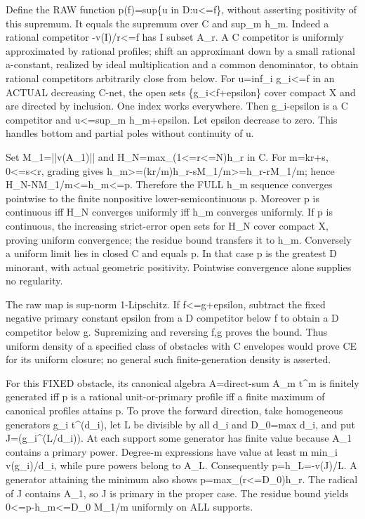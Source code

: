\documentclass[11pt]{article}
\begin{document}
Define the RAW function p(f)=sup\{u in D:u\textless{}=f\}, without asserting positivity of this supremum. It equals the supremum over C and sup\_m h\_m. Indeed a rational competitor -v(I)/r\textless{}=f has I subset A\_r. A C competitor is uniformly approximated by rational profiles; shift an approximant down by a small rational a-constant, realized by ideal multiplication and a common denominator, to obtain rational competitors arbitrarily close from below. For u=inf\_i g\_i\textless{}=f in an ACTUAL decreasing C-net, the open sets \{g\_i\textless{}f+epsilon\} cover compact X and are directed by inclusion. One index works everywhere. Then g\_i-epsilon is a C competitor and u\textless{}=sup\_m h\_m+epsilon. Let epsilon decrease to zero. This handles bottom and partial poles without continuity of u.

Set M\_1=||v(A\_1)|| and H\_N=max\_(1\textless{}=r\textless{}=N)h\_r in C. For m=kr+s, 0\textless{}=s\textless{}r, grading gives h\_m\textgreater{}=(kr/m)h\_r-sM\_1/m\textgreater{}=h\_r-rM\_1/m; hence H\_N-NM\_1/m\textless{}=h\_m\textless{}=p. Therefore the FULL h\_m sequence converges pointwise to the finite nonpositive lower-semicontinuous p. Moreover p is continuous iff H\_N converges uniformly iff h\_m converges uniformly. If p is continuous, the increasing strict-error open sets for H\_N cover compact X, proving uniform convergence; the residue bound transfers it to h\_m. Conversely a uniform limit lies in closed C and equals p. In that case p is the greatest D minorant, with actual geometric positivity. Pointwise convergence alone supplies no regularity.

The raw map is sup-norm 1-Lipschitz. If f\textless{}=g+epsilon, subtract the fixed negative primary constant epsilon from a D competitor below f to obtain a D competitor below g. Supremizing and reversing f,g proves the bound. Thus uniform density of a specified class of obstacles with C envelopes would prove CE for its uniform closure; no general such finite-generation density is asserted.

For this FIXED obstacle, its canonical algebra A=direct-sum A\_m t\textasciicircum{}m is finitely generated iff p is a rational unit-or-primary profile iff a finite maximum of canonical profiles attains p. To prove the forward direction, take homogeneous generators g\_i t\textasciicircum{}(d\_i), let L be divisible by all d\_i and D\_0=max d\_i, and put J=(g\_i\textasciicircum{}(L/d\_i)). At each support some generator has finite value because A\_1 contains a primary power. Degree-m expressions have value at least m min\_i v(g\_i)/d\_i, while pure powers belong to A\_L. Consequently p=h\_L=-v(J)/L. A generator attaining the minimum also shows p=max\_(r\textless{}=D\_0)h\_r. The radical of J contains A\_1, so J is primary in the proper case. The residue bound yields 0\textless{}=p-h\_m\textless{}=D\_0 M\_1/m uniformly on ALL supports.
\end{document}
